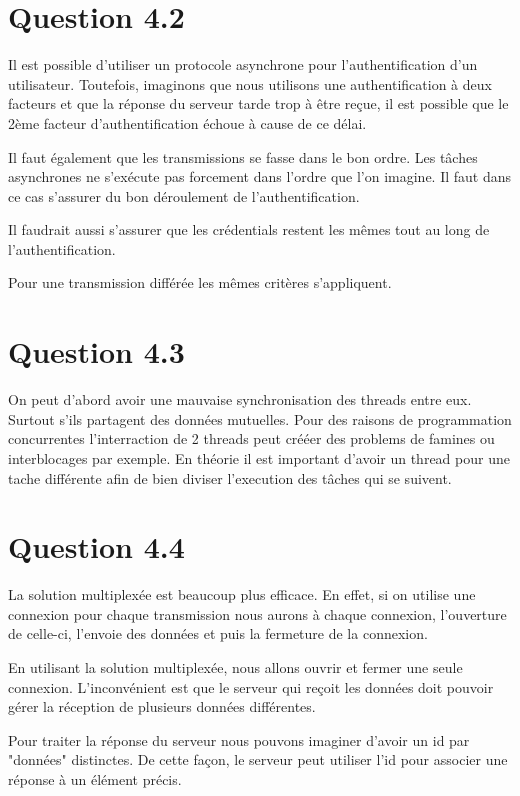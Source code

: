 \documentclass[12pt]{article}
\begin{document}
\section*{Question 4.2}

Il est possible d'utiliser un protocole asynchrone pour l'authentification d'un utilisateur.
Toutefois, imaginons que nous utilisons une authentification à deux facteurs et que la réponse du serveur tarde trop à être reçue, il est possible que le 2ème facteur d'authentification échoue à cause de ce délai.

Il faut également que les transmissions se fasse dans le bon ordre. Les tâches asynchrones ne s'exécute pas forcement dans l'ordre que l'on imagine. Il faut dans ce cas s'assurer du bon déroulement de l'authentification.

Il faudrait aussi s'assurer que les crédentials restent les mêmes tout au long de l'authentification.

Pour une transmission différée les mêmes critères s'appliquent.


\section*{Question 4.3}
On peut d'abord avoir une mauvaise synchronisation des threads entre eux. Surtout s'ils partagent des données mutuelles. Pour des raisons de programmation concurrentes l'interraction de 2 threads peut crééer des problems de famines ou interblocages par exemple.
En théorie il est important d'avoir un thread pour une tache différente afin de bien diviser l'execution des tâches qui se suivent.

\section*{Question 4.4}

La solution multiplexée est beaucoup plus efficace. En effet, si on utilise une connexion pour chaque transmission nous aurons à chaque connexion, l'ouverture de celle-ci, l'envoie des données et puis la fermeture de la connexion. 

En utilisant la solution multiplexée, nous allons ouvrir et fermer une seule connexion.
L'inconvénient est que le serveur qui reçoit les données doit pouvoir gérer la réception de plusieurs données différentes.

Pour traiter la réponse du serveur nous pouvons imaginer d'avoir un id par "données" distinctes. De cette façon, le serveur peut utiliser l'id pour associer une réponse à un élément précis.
\end{document}
